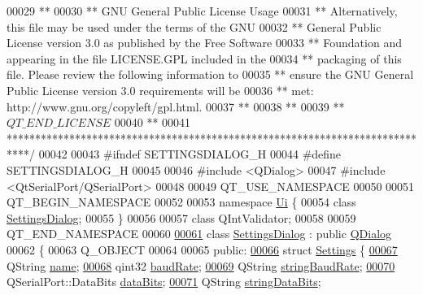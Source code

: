 \begin{DoxyCode}
00029 \textcolor{comment}{**}
00030 \textcolor{comment}{** GNU General Public License Usage}
00031 \textcolor{comment}{** Alternatively, this file may be used under the terms of the GNU}
00032 \textcolor{comment}{** General Public License version 3.0 as published by the Free Software}
00033 \textcolor{comment}{** Foundation and appearing in the file LICENSE.GPL included in the}
00034 \textcolor{comment}{** packaging of this file.  Please review the following information to}
00035 \textcolor{comment}{** ensure the GNU General Public License version 3.0 requirements will be}
00036 \textcolor{comment}{** met: http://www.gnu.org/copyleft/gpl.html.}
00037 \textcolor{comment}{**}
00038 \textcolor{comment}{**}
00039 \textcolor{comment}{** $QT\_END\_LICENSE$}
00040 \textcolor{comment}{**}
00041 \textcolor{comment}{****************************************************************************/}
00042 
00043 \textcolor{preprocessor}{#ifndef SETTINGSDIALOG\_H}
00044 \textcolor{preprocessor}{#define SETTINGSDIALOG\_H}
00045 
00046 \textcolor{preprocessor}{#include <QDialog>}
00047 \textcolor{preprocessor}{#include <QtSerialPort/QSerialPort>}
00048 
00049 QT\_USE\_NAMESPACE
00050 
00051 QT\_BEGIN\_NAMESPACE
00052 
00053 \textcolor{keyword}{namespace }\hyperlink{a00055}{Ui} \{
00054 \textcolor{keyword}{class }\hyperlink{a00022}{SettingsDialog};
00055 \}
00056 
00057 \textcolor{keyword}{class }QIntValidator;
00058 
00059 QT\_END\_NAMESPACE
00060 
\hypertarget{a00045_source_l00061}{}\hyperlink{a00022}{00061} \textcolor{keyword}{class }\hyperlink{a00022}{SettingsDialog} : \textcolor{keyword}{public} \hyperlink{a00009}{QDialog}
00062 \{
00063     Q\_OBJECT
00064 
00065 \textcolor{keyword}{public}:
\hypertarget{a00045_source_l00066}{}\hyperlink{a00022}{00066}     \textcolor{keyword}{struct }\hyperlink{a00022_dc/dfe/a00125}{Settings} \{
\hypertarget{a00045_source_l00067}{}\hyperlink{a00022_a973c8cfb942a512f34fc4227c0caa6dd}{00067}         QString \hyperlink{a00022_a973c8cfb942a512f34fc4227c0caa6dd}{name};
\hypertarget{a00045_source_l00068}{}\hyperlink{a00022_ac19cc9431552857a75c657a464ba0700}{00068}         qint32 \hyperlink{a00022_ac19cc9431552857a75c657a464ba0700}{baudRate};
\hypertarget{a00045_source_l00069}{}\hyperlink{a00022_a54e9d461f783386f314bc24b96665e53}{00069}         QString \hyperlink{a00022_a54e9d461f783386f314bc24b96665e53}{stringBaudRate};
\hypertarget{a00045_source_l00070}{}\hyperlink{a00022_a7dcd85d028a09508cb4567cf631b40e9}{00070}         QSerialPort::DataBits \hyperlink{a00022_a7dcd85d028a09508cb4567cf631b40e9}{dataBits};
\hypertarget{a00045_source_l00071}{}\hyperlink{a00022_ab589b733b78af17744ab75067bfce051}{00071}         QString \hyperlink{a00022_ab589b733b78af17744ab75067bfce051}{stringDataBits};

\end{DoxyCode}
